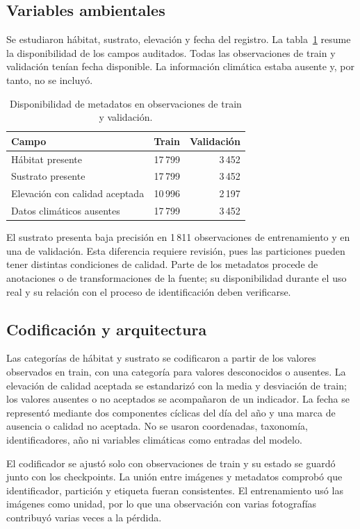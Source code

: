 \documentclass[11pt,a4paper]{article}
\begin{document}
\subsection{Variables ambientales}
Se estudiaron hábitat, sustrato, elevación y fecha del registro. La
tabla~\ref{tab:ambiental} resume la disponibilidad de los campos auditados.
Todas las observaciones de train y validación tenían fecha disponible.
La información climática estaba ausente y, por tanto, no se incluyó.

\begin{table}[H]
\centering
\caption{Disponibilidad de metadatos en observaciones de train y validación.}
\label{tab:ambiental}
\begin{tabular}{lrr}
\toprule
Campo & Train & Validación \\
\midrule
Hábitat presente & 17\,799 & 3\,452 \\
Sustrato presente & 17\,799 & 3\,452 \\
Elevación con calidad aceptada & 10\,996 & 2\,197 \\
Datos climáticos ausentes & 17\,799 & 3\,452 \\
\bottomrule
\end{tabular}
\end{table}

El sustrato presenta baja precisión en 1\,811 observaciones de entrenamiento y
en una de validación. Esta diferencia requiere revisión, pues las particiones
pueden tener distintas condiciones de calidad. Parte de los metadatos procede
de anotaciones o de transformaciones de la fuente; su disponibilidad durante el
uso real y su relación con el proceso de identificación deben verificarse.

\subsection{Codificación y arquitectura}
Las categorías de hábitat y sustrato se codificaron a partir de los valores
observados en train, con una categoría para valores desconocidos o ausentes.
La elevación de calidad aceptada se estandarizó con la media y desviación de
train; los valores ausentes o no aceptados se acompañaron de un indicador.
La fecha se representó mediante dos componentes cíclicas del día del año y una
marca de ausencia o calidad no aceptada. No se usaron coordenadas, taxonomía,
identificadores, año ni variables climáticas como entradas del modelo.

El codificador se ajustó solo con observaciones de train y su estado se guardó
junto con los checkpoints. La unión entre imágenes y metadatos comprobó que
identificador, partición y etiqueta fueran consistentes. El entrenamiento usó
las imágenes como unidad, por lo que una observación con varias fotografías
contribuyó varias veces a la pérdida.
\end{document}
